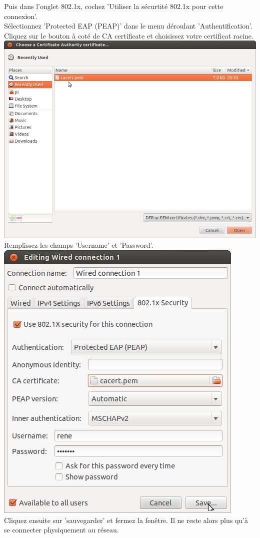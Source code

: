 Puis dans l'onglet 802.1x, cochez 'Utiliser la sécurtité 802.1x pour cette connexion'.\\
Sélectionnez 'Protected EAP (PEAP)' dans le menu déroulant 'Authentification'. 
Cliquez sur le bouton à coté de CA certificate et choisissez votre certificat racine.\\
\includegraphics[width=\screenShotSize{}]{img/selectCacert.png}\\
Remplissez les champs 'Username' et 'Password'.\\
\includegraphics[width=\screenShotSize{}]{img/peap.png}\\
Cliquez ensuite sur 'sauvegarder' et fermez la fenêtre.
Il ne reste alors plus qu'à se connecter physiquement au réseau.\\

